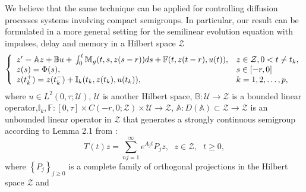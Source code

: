 \documentclass[11 pt]{amsart}
\begin{document}
We believe that the same technique  can be applied for  controlling diffusion processes systems involving compact semigroups. In particular, our result can be formulated in a more general setting  for the semilinear evolution equation with impulses, delay and memory  in a Hilbert space ${\mathcal{Z}}$
\begin{equation*}\label{eq:formulation1}
\left\{
\begin{array}{ll}
z' = {\mathbb{A}} z + {\mathbb{B}} u +{\displaystyle}\int_0^t {\mathbb{M}_g}(t,s,z(s-r))ds+ {\mathbb{F}}(t,z(t-r),u(t)),&  z \in  {\mathcal{Z}},  0< t \neq t_k, \\
z(s)=\Phi(s), &s \in [-r,0]\\
z(t_{k}^{+}) = z(t_{k}^{-})+{\mathbb{I}}_{k}(t_k, z(t_{k}),u(t_{k})), &  k=1,2, \dots, p,
\end{array}
\right.
\end{equation*}
where $u\in L^{2}(0,\tau;{\mathcal{U}})$, ${\mathcal{U}}$ is another Hilbert space, ${\mathbb{B}} :{\mathcal{U}} \longrightarrow {\mathcal{Z}}$ is a bounded linear operator,${\mathbb{I}}_{k}, {\mathbb{F}}:[0, \tau]\times C(-r,0; {\mathcal{Z}}) \times {\mathcal{U}} \rightarrow {\mathcal{Z}}$, ${\mathbb{A}} :D({\mathbb{A}}) \subset {\mathcal{Z}} \rightarrow {\mathcal{Z}}$ is an unbounded linear operator in ${\mathcal{Z}}$ that generates a strongly continuous semigroup according to
Lemma 2.1 from \cite{Leiva:2003aa}:
\begin{equation}\label{damp2}
  T(t)z =\sum_{nj=1}^{\infty}e^{A_{j}t}P_jz  \mbox{, } \ \ z\in {\mathcal{Z}} \mbox{, } \ \ t \geq 0,     
\end{equation}
where  $\left\{ P_j\right\} _{j \geq 0}$ is a complete family of orthogonal projections in the Hilbert space ${\mathcal{Z}}$ and
\end{document}
